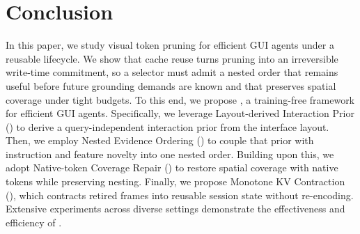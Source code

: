 \section{Conclusion}
\label{sec:conclusion}
In this paper, we study visual token pruning for efficient GUI agents under a reusable lifecycle.
%
We show that cache reuse turns pruning into an irreversible write-time commitment, so a selector must admit a nested order that remains useful before future grounding demands are known and that preserves spatial coverage under tight budgets.
%
To this end, we propose \textbf{\method{}}, a training-free framework for efficient GUI agents.
%
Specifically, we leverage Layout-derived Interaction Prior (\lmp{}) to derive a query-independent interaction prior from the interface layout.
%
Then, we employ Nested Evidence Ordering (\nwe{}) to couple that prior with instruction and feature novelty into one nested order.
%
Building upon this, we adopt Native-token Coverage Repair (\awc{}) to restore spatial coverage with native tokens while preserving nesting.
%
Finally, we propose Monotone KV Contraction (\kvr{}), which contracts retired frames into reusable session state without re-encoding.
%
Extensive experiments across diverse settings demonstrate the effectiveness and efficiency of \method{}.